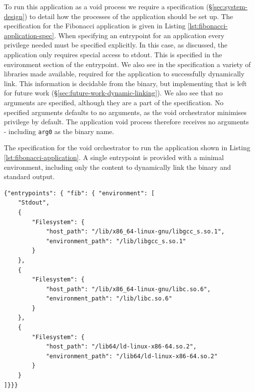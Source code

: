 \documentclass[12pt,a4paper,twoside]{report}
\begin{document}
To run this application as a void process we require a specification (§\ref{sec:system-design}) to detail how the processes of the application should be set up. The specification for the Fibonacci application is given in Listing \ref{lst:fibonacci-application-spec}. When specifying an entrypoint for an application every privilege needed must be specified explicitly. In this case, as discussed, the application only requires special access to stdout. This is specified in the environment section of the entrypoint. We also see in the specification a variety of libraries made available, required for the application to successfully dynamically link. This information is decidable from the binary, but implementing that is left for future work (§\ref{sec:future-work-dynamic-linking}). We also see that no arguments are specified, although they are a part of the specification. No specified arguments defaults to no arguments, as the void orchestrator minimises privilege by default. The application void process therefore receives no arguments - including \texttt{arg0} as the binary name.

\begin{listing}
\label{lst:fibonacci-application-spec}
\caption{The specification for the void orchestrator to run the application shown in Listing \ref{lst:fibonacci-application}. A single entrypoint is provided with a minimal environment, including only the content to dynamically link the binary and standard output.}

\begin{verbatim}
{"entrypoints": { "fib": { "environment": [
    "Stdout",
    {
        "Filesystem": {
            "host_path": "/lib/x86_64-linux-gnu/libgcc_s.so.1",
            "environment_path": "/lib/libgcc_s.so.1"
        }
    },
    {
        "Filesystem": {
            "host_path": "/lib/x86_64-linux-gnu/libc.so.6",
            "environment_path": "/lib/libc.so.6"
        }
    },
    {
        "Filesystem": {
            "host_path": "/lib64/ld-linux-x86-64.so.2",
            "environment_path": "/lib64/ld-linux-x86-64.so.2"
        }
    }
]}}}
\end{verbatim}
\end{listing}
\end{document}
